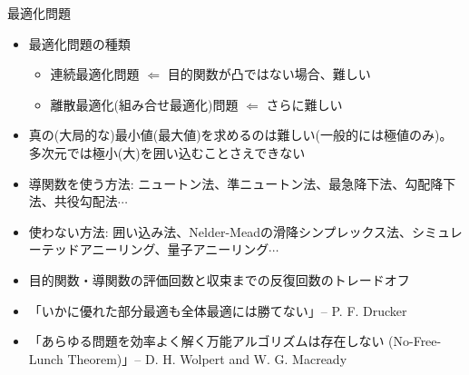 \begin{frame}[t,fragile]{最適化問題}
  \begin{itemize}
  \item 最適化問題の種類
    \begin{itemize}
    \item 連続最適化問題 $\Leftarrow$ 目的関数が凸ではない場合、難しい
    \item 離散最適化(組み合せ最適化)問題 $\Leftarrow$ さらに難しい
    \end{itemize}
  \item 真の(大局的な)最小値(最大値)を求めるのは難しい(一般的には極値のみ)。多次元では極小(大)を囲い込むことさえできない
  \item 導関数を使う方法: ニュートン法、準ニュートン法、最急降下法、勾配降下法、共役勾配法$\cdots$
  \item 使わない方法: 囲い込み法、Nelder-Meadの滑降シンプレックス法、シミュレーテッドアニーリング、量子アニーリング$\cdots$
  \item 目的関数・導関数の評価回数と収束までの反復回数のトレードオフ \\[1em]
  \item 「いかに優れた部分最適も全体最適には勝てない」-- P. F. Drucker
  \item 「あらゆる問題を効率よく解く万能アルゴリズムは存在しない (No-Free-Lunch Theorem)」-- D. H. Wolpert and W. G. Macready

  \end{itemize}
\end{frame}
